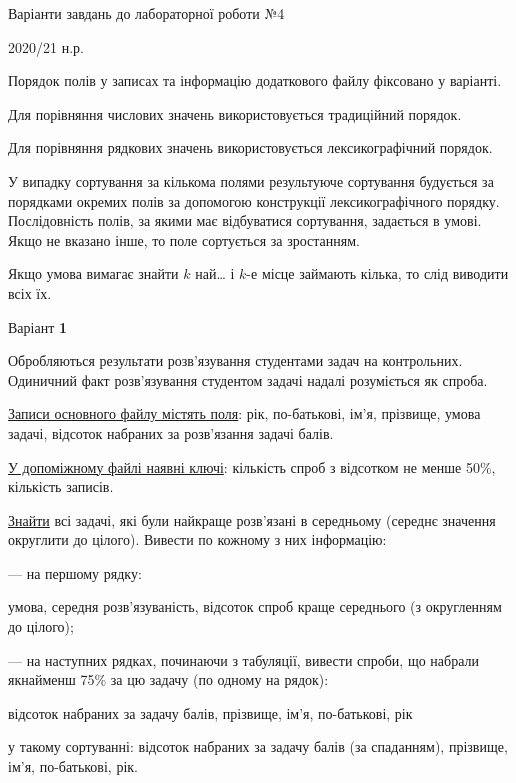 \documentclass[11pt, ukrainian]{article}
\begin{document}
{\Large \center  Варіанти завдань до лабораторної роботи №4\par 2020/21 н.р.\par \bigskip\bigskip}

Порядок полів у записах та інформацію додаткового файлу фіксовано у варіанті.

Для порівняння числових значень використовується традиційний порядок.

Для порівняння рядкових значень використовується лексикографічний порядок. 

У випадку сортування за кількома полями результуюче сортування будується 
за порядками окремих полів за допомогою конструкції лексикографічного порядку. 
Послідовність полів, за якими має відбуватися сортування, задається в умові. 
Якщо не вказано інше, то поле сортується за зростанням.

Якщо умова вимагає знайти $k$ най… і $k$-е місце займають кілька, то слід виводити всіх їх.

\newpage
\par \bigskip

{\center Варіант  \No \textbf { 1 }\par}
\bigskip
Обробляються результати розв’язування студентами задач на контрольних.
Одиничний факт роз\-в’я\-зу\-вання студентом задачі надалі розуміється як спроба.

\underline{Записи основного файлу містять поля}: рік, по-батькові, ім’я, прізвище, умова задачі, відсоток набраних за розв’язання задачі балів.

\underline{У допоміжному файлі наявні ключі}: кількість спроб з відсотком не менше 50\%, кількість записів.

\underline{Знайти} всі задачі, які були найкраще розв’язані в середньому (середнє значення округлити до цілого). Вивести по кожному з них інформацію:\par
{\noindent}--- на першому рядку:\par
умова, середня розв’язуваність, відсоток спроб краще середнього (з округленням до цілого);

{\noindent}--- на наступних рядках, починаючи з табуляції, вивести спроби, що набрали якнайменш 75\% за цю задачу (по одному на рядок):\par
відсоток набраних за задачу балів, прізвище, ім’я, по-батькові, рік

{\noindent}у такому сортуванні: відсоток набраних за задачу балів (за спаданням), прізвище, ім’я, по-батькові, рік.
\end{document}
